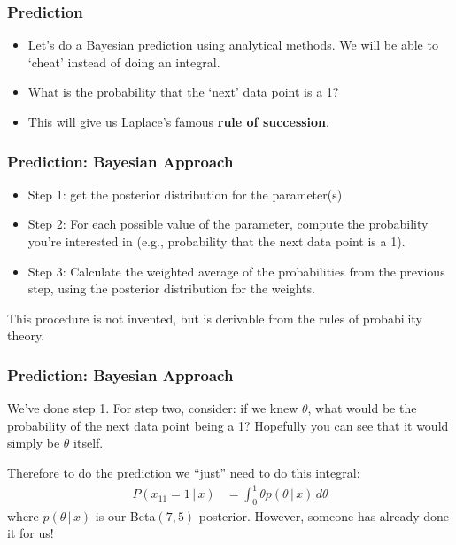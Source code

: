 \documentclass{beamer}
\newcommand{\given}{\,|\,}
\begin{document}
\begin{frame}
\frametitle{Prediction}

\begin{itemize}
\item Let's do a Bayesian prediction using analytical methods. We will be
able to `cheat' instead of doing an integral.\pause
\item What is the probability that the `next' data point is a 1?\pause
\item This will give us Laplace's famous {\bf rule of succession}.
\end{itemize}

\end{frame}

\begin{frame}
\frametitle{Prediction: Bayesian Approach}

\begin{itemize}
\item Step 1: get the posterior distribution for the parameter(s)\pause
\item Step 2: For each possible value of the parameter, compute the probability
you're interested in (e.g., probability that the next data point is a 1).\pause
\item Step 3: Calculate the weighted average of the probabilities from the previous
step, using the posterior distribution for the weights.\pause
\end{itemize}

This procedure is not invented, but is derivable from the rules of
probability theory.

\end{frame}

\begin{frame}
\frametitle{Prediction: Bayesian Approach}
We've done step 1. For step two, consider: if we knew $\theta$, what would
be the probability of the next data point being a 1? Hopefully you can see that
it would simply be $\theta$ itself.\pause

Therefore to do the prediction we ``just'' need to do this integral:
\begin{align}
P(x_{11} = 1 \given x) &= \int_0^1 \theta p(\theta \given x)\, d\theta
\end{align}
where $p(\theta \given x)$ is our Beta$(7, 5)$ posterior. However, someone
has already done it for us!

\end{frame}
\end{document}
